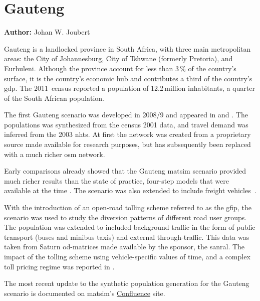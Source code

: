 \section{Gauteng}
\label{sec:gauteng}
\hfill \textbf{Author:} Johan W. Joubert

Gauteng is a landlocked province in South Africa, with  three main metropolitan areas: the City of Johannesburg, City of Tshwane (formerly Pretoria), and Eurhuleni. Although the province account for less than 3\,\% of the country's surface, it is the country's economic hub and contributes a third of the country's \gls{gdp}. The 2011~census reported a population of 12.2\,million inhabitants, a quarter of the South African population. 

The first Gauteng scenario was developed in 2008/9 and appeared in \citet[][]{Fourie2009MastersThesis} and \citet[][]{FourieJoubert_SATC_2009}. The populations was synthesized from the census 2001 data, and travel demand was inferred from the 2003 \gls{nhts}. At first the network was created from a proprietary source made available for research purposes, but has subsequently been replaced with a much richer \gls{osm} network.

Early comparisons already showed that the Gauteng \gls{matsim} scenario provided much richer results than the state of practice, four-step models that were available at the time \citep[][]{Fourie_SATC_2010}. The scenario was also extended to include freight vehicles~\citep[][]{JoubertJEtAl_TRR_2010}.

With the introduction of an open-road tolling scheme referred to as the \gls{gfip}, the scenario was used to study the diversion patterns of different road user groups. The population was extended to included background traffic in the form of public transport (buses and minibus taxis) and external through-traffic. This data was taken from Saturn \gls{od}-matrices made available by the sponsor, the \gls{sanral}. The impact of the tolling scheme using vehicle-specific values of time, and a complex toll pricing regime was reported in \citet[][]{NagelKickhoeferJoubert2014HeterogeneousVoTsPROCEDIA}.

The most recent update to the synthetic population generation for the Gauteng scenario is documented on \gls{matsim}'s \href{https://matsim.atlassian.net/wiki/display/MATPUB/South+Africa}{Confluence} site.

